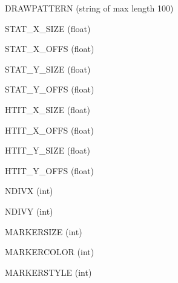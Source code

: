 \item{DRAWPATTERN}  (string of max length 100)
\item{STAT\_X\_SIZE}  (float)
\item{STAT\_X\_OFFS}  (float)
\item{STAT\_Y\_SIZE}  (float)
\item{STAT\_Y\_OFFS}  (float)
\item{HTIT\_X\_SIZE}  (float)
\item{HTIT\_X\_OFFS}  (float)
\item{HTIT\_Y\_SIZE}  (float)
\item{HTIT\_Y\_OFFS}  (float)
\item{NDIVX}  (int)
\item{NDIVY}  (int)
\item{MARKERSIZE}  (int)
\item{MARKERCOLOR}  (int)
\item{MARKERSTYLE}  (int)
